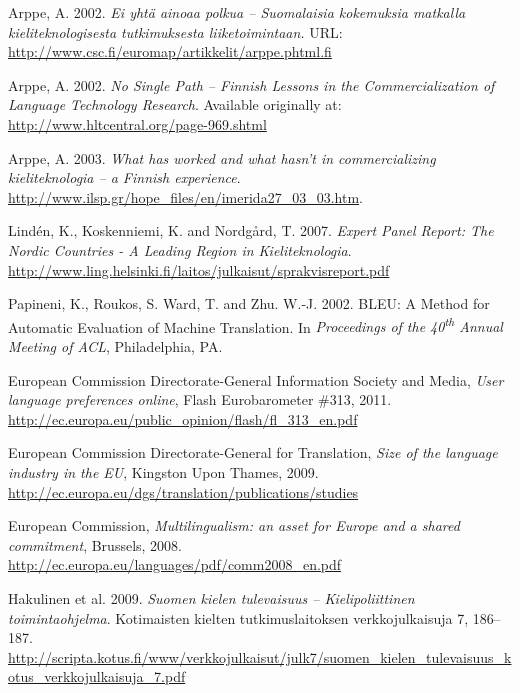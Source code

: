 \documentclass[]{../../metanetpaper}
\begin{document}
%
%  
%  
\begin{thebibliography}{102}\raggedright
{}
Arppe, A. 2002.
\emph{Ei yhtä ainoaa polkua -- Suomalaisia kokemuksia matkalla
      kieliteknologisesta tutkimuksesta liiketoimintaan.}
URL:
\url{http://www.csc.fi/euromap/artikkelit/arppe.phtml.fi}

Arppe, A. 2002.
\emph{No Single Path -- Finnish Lessons in the Commercialization of
      Language Technology Research}.
Available originally at:
\url{http://www.hltcentral.org/page-969.shtml}

Arppe, A. 2003.
\emph{What has worked and what hasn't in commercializing kieliteknologia --
      a Finnish experience}.
\url{http://www.ilsp.gr/hope_files/en/imerida27_03_03.htm}.

Lindén, K., Koskenniemi, K. and Nordgård, T. 2007.
\emph{Expert Panel Report: The
Nordic Countries - A Leading Region in Kieliteknologia}.
\url{http://www.ling.helsinki.fi/laitos/julkaisut/sprakvisreport.pdf}

Papineni, K., Roukos, S. Ward, T. and Zhu. W.-J. 2002.
BLEU: A Method for Automatic Evaluation of Machine Translation.
In \emph{Proceedings of the 40\textsuperscript{th} Annual Meeting of ACL},
Philadelphia, PA.

European Commission Directorate-General Information Society and Media,
\emph{User language preferences online}, Flash Eurobarometer \#313, 2011.
\url{http://ec.europa.eu/public_opinion/flash/fl_313_en.pdf}

European Commission Directorate-General for Translation,
\emph{Size of the language industry in the EU}, Kingston Upon Thames, 2009.
\url{http://ec.europa.eu/dgs/translation/publications/studies}

European Commission,
\emph{Multilingualism: an asset for Europe and a shared commitment},
Brussels, 2008.
\url{http://ec.europa.eu/languages/pdf/comm2008_en.pdf}

Hakulinen et al. 2009.
\emph{Suomen kielen tulevaisuus -- Kielipoliittinen
toimintaohjelma}. Kotimaisten kielten tutkimuslaitoksen verkkojulkaisuja 7,
186–187.
\url{http://scripta.kotus.fi/www/verkkojulkaisut/julk7/suomen_kielen_tulevaisuus_kotus_verkkojulkaisuja_7.pdf}


\end{thebibliography}
\end{document}
